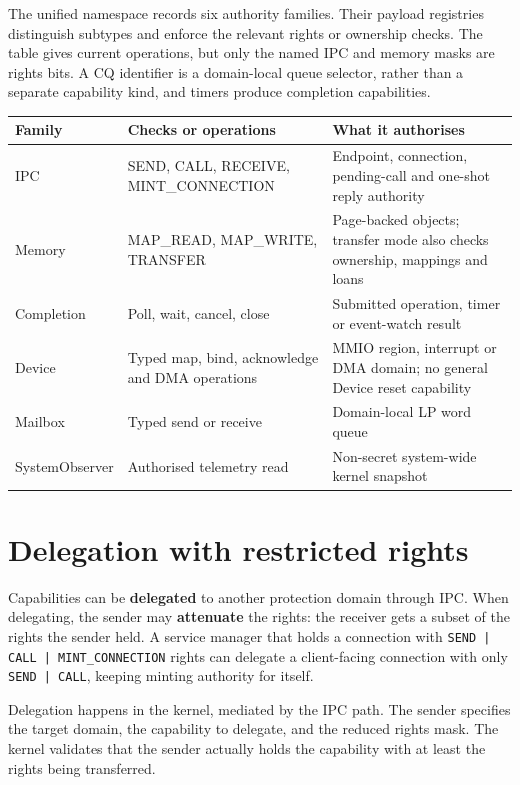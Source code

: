 The unified namespace records six authority families. Their payload registries
distinguish subtypes and enforce the relevant rights or ownership checks. The
table gives current operations, but only the named IPC and memory masks are rights
bits. A CQ identifier is a domain-local queue selector, rather than a separate
capability kind, and timers produce completion capabilities.

\begin{longtable}{|p{2.8cm}|p{3.5cm}|p{5.9cm}|}
\hline
\textbf{Family} & \textbf{Checks or operations} & \textbf{What it authorises} \\
\hline
IPC & SEND, CALL, RECEIVE, MINT\_\allowbreak CONNECTION & Endpoint, connection, pending-call and one-shot reply authority \\
Memory & MAP\_READ, MAP\_WRITE, TRANSFER & Page-backed objects; transfer mode also checks ownership, mappings and loans \\
Completion & Poll, wait, cancel, close & Submitted operation, timer or event-watch result \\
Device & Typed map, bind, acknowledge and DMA operations & MMIO region, interrupt or DMA domain; no general Device reset capability \\
Mailbox & Typed send or receive & Domain-local LP word queue \\
SystemObserver & Authorised telemetry read & Non-secret system-wide kernel snapshot \\
\hline
\end{longtable}

\section{Delegation with restricted rights}

Capabilities can be \textbf{delegated} to another protection domain through IPC.
When delegating, the sender may \textbf{attenuate} the rights: the receiver gets a
subset of the rights the sender held. A service manager that holds a connection
with \texttt{SEND | CALL | MINT\_CONNECTION} rights can delegate a client-facing
connection with only \texttt{SEND | CALL}, keeping minting authority for itself.

Delegation happens in the kernel, mediated by the IPC path. The sender specifies
the target domain, the capability to delegate, and the reduced rights mask. The
kernel validates that the sender actually holds the capability with at least the
rights being transferred.

